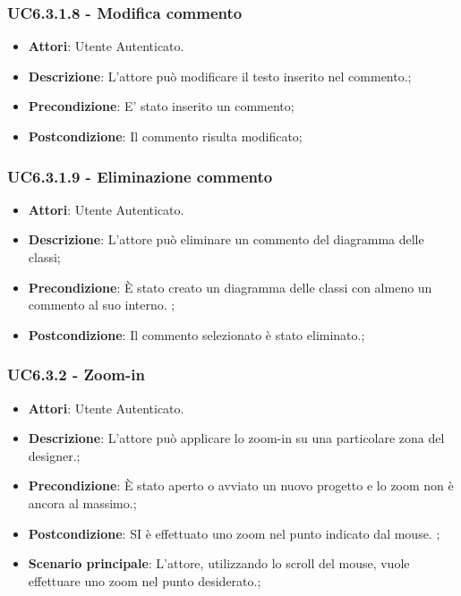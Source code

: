 \subsubsection{UC6.3.1.8 - Modifica commento} 
\label{sssec:UC6.3.1.8} 
\begin{itemize} 
\item \textbf{Attori}: Utente Autenticato.
\item \textbf{Descrizione}: L'attore può modificare il testo inserito nel commento.;
\item \textbf{Precondizione}: E' stato inserito un commento;
\item \textbf{Postcondizione}: Il commento risulta modificato;
\end{itemize} 
\subsubsection{UC6.3.1.9 - Eliminazione commento} 
\label{sssec:UC6.3.1.9} 
\begin{itemize} 
\item \textbf{Attori}: Utente Autenticato.
\item \textbf{Descrizione}: L'attore può eliminare un commento del diagramma delle classi;
\item \textbf{Precondizione}: È stato creato un diagramma delle classi con almeno un commento al suo interno.
;
\item \textbf{Postcondizione}: Il commento selezionato è stato eliminato.;
\end{itemize} 
\subsubsection{UC6.3.2 - Zoom-in} 
\label{sssec:UC6.3.2} 
\begin{itemize} 
\item \textbf{Attori}: Utente Autenticato.
\item \textbf{Descrizione}: L'attore può applicare lo zoom-in su una particolare zona del designer.;
\item \textbf{Precondizione}: È stato aperto o avviato un nuovo progetto e lo zoom non è ancora al massimo.;
\item \textbf{Postcondizione}: SI è effettuato uno zoom nel punto indicato dal mouse.
;
\item \textbf{Scenario principale}: L'attore, utilizzando lo scroll del mouse, vuole effettuare uno zoom nel punto desiderato.;\end{itemize} 
